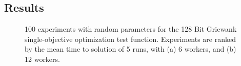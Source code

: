\documentclass{llncs}
\begin{document}
\subsection{Results}
\label{sec:results}

\begin{figure}[t]
    \centering

    \caption{100 experiments with random parameters for the 128 Bit Griewank 
    single-objective optimization test function. Experiments are ranked by 
    the mean time to solution of 5 runs, with (a) 6 workers, and (b) 12 workers.}
    \label{fig:griewank}
\end{figure}
\end{document}
